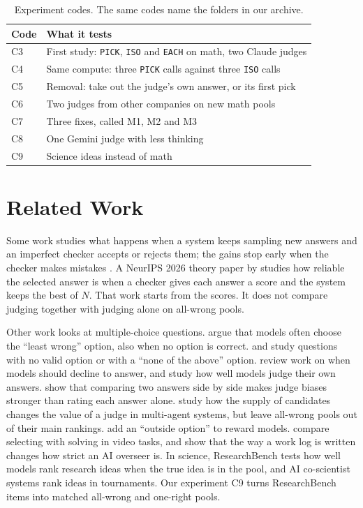 \documentclass[10pt,twocolumn]{article}
\begin{document}
\begin{table}[t]
\centering\footnotesize
\begin{tabular}{lp{}}
\toprule
Code & What it tests \\
\midrule
C3 & First study: \texttt{PICK}, \texttt{ISO} and \texttt{EACH} on math, two Claude judges \\
C4 & Same compute: three \texttt{PICK} calls against three \texttt{ISO} calls \\
C5 & Removal: take out the judge's own answer, or its first pick \\
C6 & Two judges from other companies on new math pools \\
C7 & Three fixes, called M1, M2 and M3 \\
C8 & One Gemini judge with less thinking \\
C9 & Science ideas instead of math \\
\bottomrule
\end{tabular}
\caption{Experiment codes. The same codes name the folders in our archive.}
\label{tab:codes}
\end{table}

\section{Related Work}
Some work studies what happens when a system keeps sampling new answers and an imperfect checker accepts or rejects them; the gains stop early when the checker makes mistakes \citep{stroebl2026limits}. A NeurIPS 2026 theory paper by \citet{zhang2026selected} studies how reliable the selected answer is when a checker gives each answer a score and the system keeps the best of $N$. That work starts from the scores. It does not compare judging together with judging alone on all-wrong pools.

Other work looks at multiple-choice questions. \citet{wang2025llms} argue that models often choose the ``least wrong'' option, also when no option is correct. \citet{kim2026penalty} and \citet{tam2025none} study questions with no valid option or with a ``none of the above'' option. \citet{wen2025know} review work on when models should decline to answer, and \citet{kadavath2022language} study how well models judge their own answers. \citet{jeong2025comparative} show that comparing two answers side by side makes judge biases stronger than rating each answer alone. \citet{ji2026candidate} study how the supply of candidates changes the value of a judge in multi-agent systems, but leave all-wrong pools out of their main rankings. \citet{rho2025best} add an ``outside option'' to reward models. \citet{ma2026selecting} compare selecting with solving in video tasks, and \citet{chen2026beyond} show that the way a work log is written changes how strict an AI overseer is. In science, ResearchBench \citep{liu2025researchbench} tests how well models rank research ideas when the true idea is in the pool, and AI co-scientist systems \citep{gottweis2025towards} rank ideas in tournaments. Our experiment C9 turns ResearchBench items into matched all-wrong and one-right pools.
\end{document}
